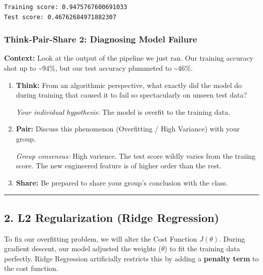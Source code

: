 \documentclass[11pt]{article}
\begin{document}
    \begin{Verbatim}[commandchars=\\\{\}]
Training score: 0.9475767600691033
Test score: 0.46762684971882307
    \end{Verbatim}

    \subsubsection{Think-Pair-Share 2: Diagnosing Model
Failure}\label{think-pair-share-2-diagnosing-model-failure}

\textbf{Context:} Look at the output of the pipeline we just ran. Our
training accuracy shot up to \textasciitilde94\%, but our test accuracy
plummeted to \textasciitilde46\%.

\begin{enumerate}
\def\labelenumi{\arabic{enumi}.}
\item
  \textbf{Think:} From an algorithmic perspective, what exactly did the
  model do during training that caused it to fail so spectacularly on
  unseen test data?

  \emph{Your individual hypothesis:} The model is overfit to the
  training data.
\item
  \textbf{Pair:} Discuss this phenomenon (Overfitting / High Variance)
  with your group.

  \emph{Group consensus:} High varience. The test score wildly varies
  from the traiing score. The new engineered feature is of higher order
  than the rest.
\item
  \textbf{Share:} Be prepared to share your group's conclusion with the
  class.
\end{enumerate}

\begin{center}\rule{0.5\linewidth}{0.5pt}\end{center}

    \subsection{2. L2 Regularization (Ridge
Regression)}\label{l2-regularization-ridge-regression}

To fix our overfitting problem, we will alter the Cost Function
\(J(\theta)\). During gradient descent, our model adjusted the weights
(\(\theta\)) to fit the training data perfectly. Ridge Regression
artificially restricts this by adding a \textbf{penalty term} to the
cost function.
\end{document}
